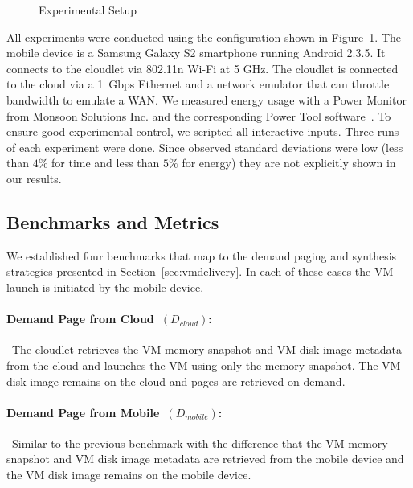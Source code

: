 \begin{figure}
\centering
{}
\vspace{-0.1in}
\caption{Experimental Setup}
\vspace{-0.2in}
\label{fig:exp-setup}
\end{figure}

All experiments were conducted using the configuration shown in
Figure~\ref{fig:exp-setup}.  The mobile device is a Samsung Galaxy S2
smartphone running Android 2.3.5. It connects to the cloudlet via
802.11n Wi-Fi at 5 GHz.  The cloudlet is connected to the cloud via a
1~Gbps Ethernet and a network emulator that can throttle bandwidth to
emulate a WAN.  We measured energy usage with a Power Monitor from
Monsoon Solutions Inc. and the corresponding Power Tool
software~\cite{Monsoon2011}.  To ensure good experimental control, we
scripted all interactive inputs.  Three runs of each experiment were
done.  Since observed standard deviations were low (less than
$4\%$ for time and less than $5\%$ for energy) they are not
explicitly shown in our results.

\subsection{Benchmarks and Metrics} 
\label{sec:benchmarks}

We established four benchmarks that map to the demand paging and synthesis
strategies presented in Section~\ref{sec:vmdelivery}. In each of these 
cases the VM launch is initiated by the mobile device.

\paragraph{Demand Page from Cloud~$(D_{cloud})$:}~The cloudlet 
retrieves the VM memory snapshot and VM disk image metadata from the cloud and 
launches the VM using only the memory snapshot. The VM disk 
image remains on the cloud and pages are retrieved on demand. 

\paragraph{Demand Page from Mobile~$(D_{mobile})$:}~Similar to the previous
benchmark with the difference that the VM memory snapshot and VM disk 
image metadata are retrieved from the mobile device and the VM disk image
remains on the mobile device. 

